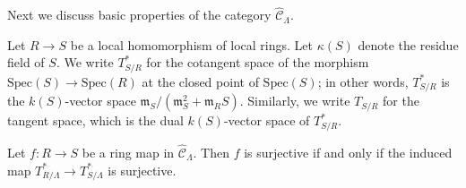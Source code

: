 \noindent
Next we discuss basic properties of the category $\widehat{\mathcal 
C}_{\Lambda}$.
\begin{definition}
\label{definition-tangent-space-ring}
Let $R \rightarrow S$ be a local homomorphism of local rings.  Let $\kappa(S)$ 
denote the residue field of $S$.  We write $T^*_{S/R}$ for the cotangent space 
of the morphism $\text{Spec}(S) \rightarrow \text{Spec}(R)$ at the closed point 
of $\text{Spec}(S)$; in other words, $T^*_{S/R}$ is the $k(S)$-vector space 
$\mathfrak{m}_{S}/(\mathfrak{m}_{S}^2 + \mathfrak{m}_{R}S)$.  Similarly, we 
write $T_{S/R}$ for the tangent space, which is the dual $k(S)$-vector space of 
$T^*_{S/R}$.
\end{definition}

\begin{lemma}
\label{lemma-surjective-cotangent-space}
Let $f: R \rightarrow S$ be a ring map in $\widehat{\mathcal C}_{\Lambda}$.  
Then $f$ is surjective if and only if the induced map $T^*_{R/\Lambda} 
\rightarrow T^*_{S/\Lambda}$ is surjective.
\end{lemma}

